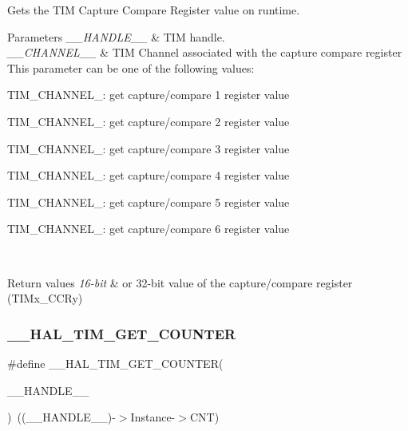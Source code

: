 Gets the T\+IM Capture Compare Register value on runtime. 


\begin{DoxyParams}{Parameters}
{\em \+\_\+\+\_\+\+H\+A\+N\+D\+L\+E\+\_\+\+\_\+} & T\+IM handle. \\
\hline
{\em \+\_\+\+\_\+\+C\+H\+A\+N\+N\+E\+L\+\_\+\+\_\+} & T\+IM Channel associated with the capture compare register This parameter can be one of the following values\+: \begin{DoxyItemize}
\item T\+I\+M\+\_\+\+C\+H\+A\+N\+N\+E\+L\+\_\+: get capture/compare 1 register value \item T\+I\+M\+\_\+\+C\+H\+A\+N\+N\+E\+L\+\_\+: get capture/compare 2 register value \item T\+I\+M\+\_\+\+C\+H\+A\+N\+N\+E\+L\+\_\+: get capture/compare 3 register value \item T\+I\+M\+\_\+\+C\+H\+A\+N\+N\+E\+L\+\_\+: get capture/compare 4 register value \item T\+I\+M\+\_\+\+C\+H\+A\+N\+N\+E\+L\+\_\+: get capture/compare 5 register value \item T\+I\+M\+\_\+\+C\+H\+A\+N\+N\+E\+L\+\_\+: get capture/compare 6 register value \end{DoxyItemize}
\\
\hline
\end{DoxyParams}

\begin{DoxyRetVals}{Return values}
{\em 16-\/bit} & or 32-\/bit value of the capture/compare register (T\+I\+Mx\+\_\+\+C\+C\+Ry) \\
\hline
\end{DoxyRetVals}
\mbox{\label{group___t_i_m___exported___macros_gaf1af08014b9d06efbbb091d58d47c8ba}} 
\subsubsection{\texorpdfstring{\+\_\+\+\_\+\+H\+A\+L\+\_\+\+T\+I\+M\+\_\+\+G\+E\+T\+\_\+\+C\+O\+U\+N\+T\+ER}{\_\_HAL\_TIM\_GET\_COUNTER}}
{\footnotesize\ttfamily \#define \+\_\+\+\_\+\+H\+A\+L\+\_\+\+T\+I\+M\+\_\+\+G\+E\+T\+\_\+\+C\+O\+U\+N\+T\+ER(\begin{DoxyParamCaption}\item[{}]{\+\_\+\+\_\+\+H\+A\+N\+D\+L\+E\+\_\+\+\_\+ }\end{DoxyParamCaption})~((\+\_\+\+\_\+\+H\+A\+N\+D\+L\+E\+\_\+\+\_\+)-\/$>$Instance-\/$>$C\+NT)}



